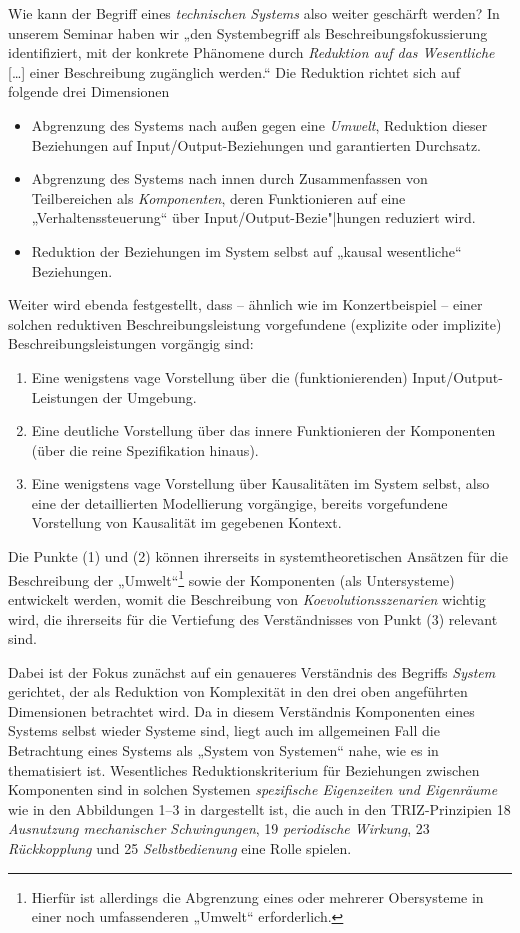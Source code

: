 \documentclass[11pt,a4paper]{article}
\begin{document}
Wie kann der Begriff eines \emph{technischen Systems} also weiter geschärft
werden?  In unserem Seminar \cite{Graebe2020} haben wir „den Systembegriff als
Beschreibungsfokussierung identifiziert, mit der konkrete Phänomene durch
\emph{Reduktion auf das Wesentliche} [\ldots] einer Beschreibung zugänglich
werden.“  Die Reduktion richtet sich auf folgende drei Dimensionen
\cite[S. 18]{Graebe2020} 
\begin{itemize}
\item [(1)] Abgrenzung des Systems nach außen gegen eine \emph{Umwelt},
  Reduktion dieser Beziehungen auf Input/Output-Beziehungen und garantierten
  Durchsatz.
\item [(2)] Abgrenzung des Systems nach innen durch Zusammenfassen von
  Teilbereichen als \emph{Komponenten}, deren Funktionieren auf eine
  „Verhaltenssteuerung“ über Input/Output-Bezie"|hungen reduziert wird.
\item [(3)] Reduktion der Beziehungen im System selbst auf „kausal
  wesentliche“ Beziehungen.
\end{itemize}
Weiter wird ebenda festgestellt, dass -- ähnlich wie im Konzertbeispiel --
einer solchen reduktiven Beschreibungsleistung vorgefundene (explizite oder
implizite) Beschreibungsleistungen vorgängig sind:
\begin{enumerate}
\item[(1)] Eine wenigstens vage Vorstellung über die (funktionierenden)
  Input/Output-Leistungen der Umgebung.
\item[(2)] Eine deutliche Vorstellung über das innere Funktionieren der
  Komponenten (über die reine Spezifikation hinaus).
\item[(3)] Eine wenigstens vage Vorstellung über Kausalitäten im System
  selbst, also eine der detaillierten Modellierung vorgängige, bereits
  vorgefundene Vorstellung von Kausalität im gegebenen Kontext.
\end{enumerate}
Die Punkte (1) und (2) können ihrerseits in systemtheoretischen Ansätzen für
die Beschreibung der „Umwelt“\footnote{Hierfür ist allerdings die Abgrenzung
  eines oder mehrerer Obersysteme in einer noch umfassenderen „Umwelt“
  erforderlich.}  sowie der Komponenten (als Untersysteme) entwickelt werden,
womit die Beschreibung von \emph{Koevolutionsszenarien} wichtig wird, die
ihrerseits für die Vertiefung des Verständnisses von Punkt (3) relevant sind.

Dabei ist der Fokus zunächst auf ein genaueres Verständnis des Begriffs
\emph{System} gerichtet, der als Reduktion von Komplexität in den drei oben
angeführten Dimensionen betrachtet wird. Da in diesem Verständnis Komponenten
eines Systems selbst wieder Systeme sind, liegt auch im allgemeinen Fall die
Betrachtung eines Systems als „System von Systemen“ nahe, wie es in
\cite{Holling2000} thematisiert ist.  Wesentliches Reduktionskriterium für
Beziehungen zwischen Komponenten sind in solchen Systemen \emph{spezifische
  Eigenzeiten und Eigenräume} wie in den Abbildungen 1--3 in
\cite{Holling2000} dargestellt ist, die auch in den TRIZ-Prinzipien 18
\emph{Ausnutzung mechanischer Schwingungen}, 19 \emph{periodische Wirkung}, 23
\emph{Rückkopplung} und 25 \emph{Selbstbedienung} eine Rolle spielen.
\end{document}
